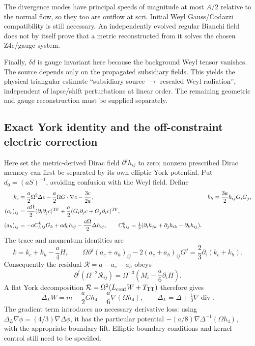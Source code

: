 The divergence modes have principal speeds of magnitude at most $A/2$
relative to the normal flow, so they too are outflow at scri.  Initial Weyl
Gauss/Codazzi compatibility is still necessary.  An independently evolved
regular Bianchi field does not by itself prove that a metric reconstructed
from it solves the chosen Z4c/gauge system.

Finally, $\delta d$ is gauge invariant here because the background Weyl
tensor vanishes.  The source depends only on the propagated subsidiary
fields.  This yields the physical triangular estimate
``subsidiary source $\longrightarrow$ rescaled Weyl radiation'', independent
of lapse/shift perturbations at linear order.  The remaining geometric and
gauge reconstruction must be supplied separately.

\subsection{Exact York identity and the off-constraint electric correction}

Here set the metric-derived Dirac field $\partial^jh_{ij}$ to zero;
nonzero prescribed Dirac memory can first be separated by its own elliptic
York potential.  Put $d_0=(aS)^{-1}$, avoiding confusion with the Weyl field.
Define
\begin{align*}
 k_c&=\frac a2\Omega^2\Delta c-
 \frac a2\Omega G\cdot\nabla c-\frac{3c}{2a},&
 k_h&=\frac{3a}{2}h_{ij}G_iG_j,\\
 (a_c)_{ij}&=\frac{a\Omega}{2}(\partial_i\partial_jc)^{\rm TF}
 +\frac a2(G_i\partial_jc+G_j\partial_ic)^{\rm TF},\\
 (a_h)_{ij}&=-a C_h^k{}_{ij}G_k+ad_0h_{ij}
 -\frac{a\Omega}{2}\Delta h_{ij},
 \qquad
 C_h^k{}_{ij}=\tfrac12(\partial_i h_{jk}+\partial_jh_{ik}-\partial_kh_{ij}).
\end{align*}
The trace and momentum identities are
\[
 k=k_c+k_h-\frac a4H,\qquad
 \Omega\partial^j(a_c+a_h)_{ij}
 -2(a_c+a_h)_{ij}G^j=\frac23\partial_i(k_c+k_h).
\]
Consequently the residual $\mathcal R=a-a_c-a_h$ obeys
\[
 \partial^j(\Omega^{-2}\mathcal R_{ij})
 =\Omega^{-3}\left(M_i-\frac a6\partial_iH\right).
\]
A flat York decomposition $\mathcal R=\Omega^2(L_{\rm conf}W+T_{\rm TT})$
therefore gives
\[
 \Delta_LW=m-\frac a2G h_4-\frac a6\nabla(\Omega h_4),\qquad
 \Delta_L=\Delta+\tfrac13\nabla\operatorname{div}.
\]
The gradient term introduces no necessary derivative loss: using
$\Delta_L\nabla\phi=(4/3)\nabla\Delta\phi$, it has the particular
potential $-(a/8)\nabla\Delta^{-1}(\Omega h_4)$, with the appropriate
boundary lift.  Elliptic boundary conditions and kernel control still need
to be specified.

